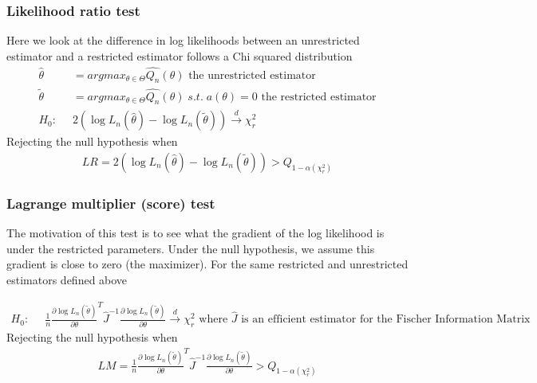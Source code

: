 \documentclass{article}
\begin{document}
\subsubsection{Likelihood ratio test}
Here we look at the difference in log likelihoods between an unrestricted estimator and a restricted estimator follows a Chi squared distribution
\begin{align*}
  \hat{\theta} &= argmax_{\theta \in \Theta} \hat{Q_n}(\theta) \textrm{ the unrestricted estimator}\\
  \tilde{\theta} &= argmax_{\theta \in \Theta} \hat{Q_n}(\theta) \; s.t. \; a(\theta) = 0 \textrm{ the restricted estimator}\\
  H_0: \;\; & 2(\log L_n(\hat{\theta}) - \log L_n(\tilde{\theta})) \overset{d}{\longrightarrow} \chi_r^2
\end{align*}
Rejecting the null hypothesis when
\begin{align*}
  LR = 2(\log L_n(\hat{\theta}) - \log L_n(\tilde{\theta})) > Q_{1-\alpha(\chi_r^2)}
\end{align*}


\subsubsection{Lagrange multiplier (score) test}
The motivation of this test is to see what the gradient of the log likelihood is under the restricted parameters. Under the null hypothesis, we assume this gradient is close to zero (the maximizer). For the same restricted and unrestricted estimators defined above

\begin{align*}
  H_0: \;\; & \frac{1}{n} \frac{\partial \log L_n(\tilde{\theta})}{\partial \theta}^T \hat{J}^{-1} \frac{\partial \log L_n(\tilde{\theta})}{\partial \theta} \overset{d}{\longrightarrow} \chi_r^2 \textrm{ where $\hat{J}$ is an efficient estimator for the Fischer Information Matrix}
\end{align*}
Rejecting the null hypothesis when
\begin{align*}
  LM = \frac{1}{n} \frac{\partial \log L_n(\tilde{\theta})}{\partial \theta}^T \hat{J}^{-1} \frac{\partial \log L_n(\tilde{\theta})}{\partial \theta} > Q_{1-\alpha(\chi_r^2)}
\end{align*}
\end{document}
